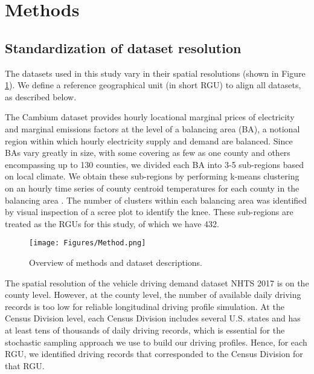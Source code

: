 \documentclass[11pt,preprint]{elsarticle}
\begin{document}
\section{Methods}

\subsection{Standardization of dataset resolution}\label{sec:harmony}

The datasets used in this study vary in their spatial resolutions (shown in Figure \ref{fig:method}). We define a reference geographical unit (in short RGU) to align all datasets, as described below.

The Cambium dataset provides hourly locational marginal prices of electricity and marginal emissions factors at the level of a balancing area (BA), a notional region within which hourly electricity supply and demand are balanced. Since BAs vary greatly in size, with some covering as few as one county and others encompassing up to 130 counties, we divided each BA into 3-5 sub-regions based on local climate. 
We obtain these sub-regions by performing k-means clustering on an hourly time series of county centroid temperatures for each county in the balancing area \cite{noauthor_weather_2024}. The number of clusters within each balancing area was identified by visual inspection of a scree plot to identify the knee. These sub-regions are treated as the RGUs for this study, of which we have 432.

\begin{figure}
    \centering
    \texttt{[image: Figures/Method.png]}
    \caption{Overview of methods and dataset descriptions.}
    \label{fig:method}
\end{figure}

The spatial resolution of the vehicle driving demand dataset NHTS 2017 is on the county level. However, at the county level, the number of available daily driving records is too low for reliable longitudinal driving profile simulation. At the Census Division level, each Census Division includes several U.S. states and has at least tens of thousands of daily driving records, which is essential for the stochastic sampling approach we use to build our driving profiles. Hence, for each RGU, we identified driving records that corresponded to the Census Division for that RGU. 
\end{document}
